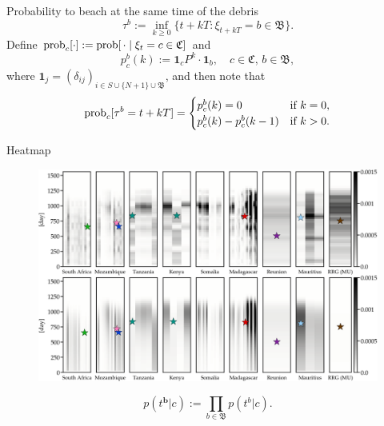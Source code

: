 \documentclass{beamer}
\renewcommand{\Pr}{\mathop{\rm prob}\nolimits}
\begin{document}
\begin{frame}{Probability to beach at the same time of the debris}
  \begin{equation}
  \tau^b := \inf_{k\ge 0}\{t+kT : \xi_{t+kT} = b\in \mathfrak B\}.
\end{equation}
Define $\Pr_c[\cdot] :=  \Pr[\,\cdot \mid \xi_t = c\in \mathfrak C]$ and
\begin{equation}
  p_c^b(k) := \mathbf 1_c P^k \cdot \mathbf 1_b,\quad c\in
  \mathfrak C,\, b\in \mathfrak B,
\end{equation}
where $\mathbf 1_j = (\delta_{ij})_{i\in S \cup
\{N+1\} \cup \mathfrak B}$, and then note that
\begin{equation}
  \Pr_c[\tau^b = t+kT] = 
  \begin{cases} 
   p_c^b(k) = 0           & \text{if } k = 0,\\
   p_c^b(k) - p_c^b(k-1)  & \text{if } k > 0.
  \end{cases}
  \label{eq:p}
\end{equation}
\end{frame}

\begin{frame}{Heatmap}

\begin{figure}[hbt]
  \includegraphics[width=\textwidth]{figures/mh370-fig03-si.png}
\end{figure}

\end{frame}


\begin{frame}

\begin{equation}
  p(t^\mathbf{b}|c) := \prod_{b\in \mathfrak B} p(t^b|c). 
\end{equation}

\end{frame}
\end{document}
